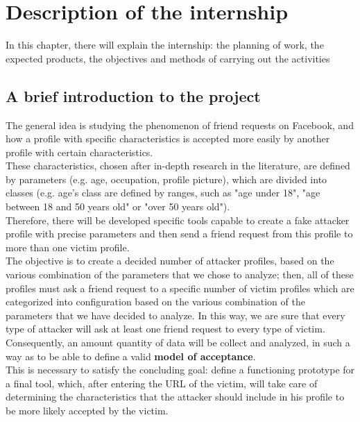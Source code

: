 
\chapter{Description of the internship}
\label{cap:descrizione-stage}

In this chapter, there will explain the internship: the planning of work, the expected products, the objectives and methods of carrying out the activities\\

\section{A brief introduction to the project}
The general idea is studying the phenomenon of friend requests on Facebook, and how a profile with specific characteristics is accepted more easily by another profile with certain characteristics. \\
These characteristics, chosen after in-depth research in the literature, are defined by parameters (e.g. age, occupation, profile picture), which are divided into classes (e.g. age's class are defined by ranges, such as "age under 18", "age between 18 and 50 years old" or "over 50 years old").
\\Therefore, there will be developed specific tools capable to create a fake attacker profile with precise parameters and then send a friend request from this profile to more than one victim profile. \\The objective is to create a decided number of attacker profiles, based on the various combination of the parameters that we chose to analyze; then, all of these profiles must ask a friend request to a specific number of victim profiles which are categorized into configuration based on the various combination of the parameters that we have decided to analyze. In this way, we are sure that every type of attacker will ask at least one friend request to every type of victim. \\Consequently, an amount quantity of data will be collect and analyzed, in such a way as to be able to define a valid \textbf{model of acceptance}.
\\This is necessary to satisfy the concluding goal: define a functioning prototype for a final tool, which, after entering the URL of the victim, will take care of determining the characteristics that the attacker should include in his profile to be more likely accepted by the victim.

